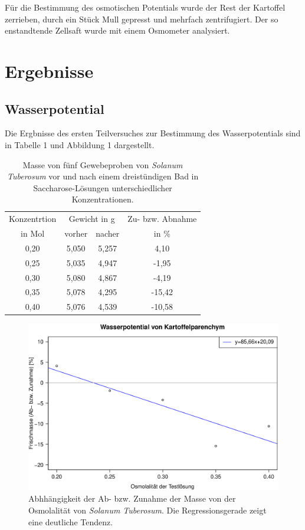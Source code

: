 \documentclass[11pt,a4paper,DIV=10,]{scrartcl}
\begin{document}
Für die Bestimmung des osmotischen Potentials wurde der Rest der Kartoffel zerrieben, durch ein Stück Mull gepresst und mehrfach zentrifugiert. Der so enstandtende Zellsaft wurde mit einem Osmometer analysiert.
%
\section*{Ergebnisse}
\subsection*{Wasserpotential}
Die Ergbnisse des ersten Teilversuches zur Bestimmung des Wasserpotentials sind in Tabelle 1 und Abbildung 1 dargestellt.
\begin{table}[H]
\caption{Masse von fünf Gewebeproben von \textit{Solanum Tuberosum} vor und nach einem dreistündigen Bad in Saccharose-Lösungen unterschiedlicher Konzentrationen.}
\label{tab1}
\center
\begin{tabular}{cccc}
\toprule
Konzentrtion &\multicolumn{2}{c}{Gewicht in g} & Zu- bzw. Abnahme \\
in Mol &vorher & nacher & in \%\\
\midrule
0,20 & 5,050 & 5,257 & 4,10 \\
0,25 & 5,035 & 4,947 & -1,95\\
0,30 & 5,080 & 4,867 & -4,19\\
0,35 & 5,078 & 4,295 & -15,42\\
0,40 & 5,076 & 4,539 & -10,58\\
\bottomrule
\end{tabular}
\end{table}
\begin{figure}[H]
\center
\captionsetup{width=1\textwidth}	
\includegraphics[width=1.0\textwidth]{Abbildungen/Rplot01}
\caption{Abhhängigkeit der Ab- bzw. Zunahme der Masse von der Osmolalität von \textit{Solanum Tuberosum}. Die Regressionsgerade zeigt eine deutliche Tendenz.}
\label{v1}
\end{figure}
\end{document}
